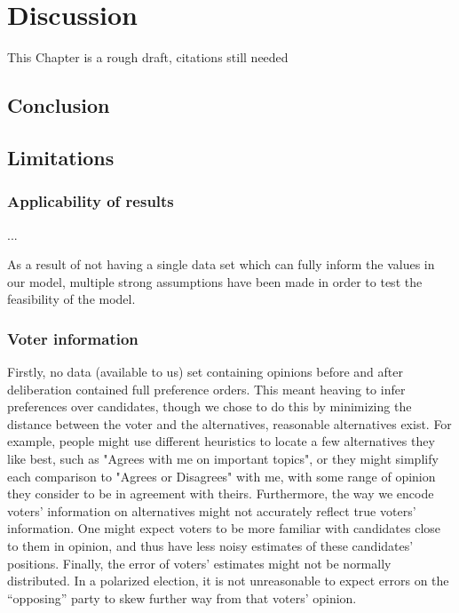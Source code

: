 \newpage
\chapter{Discussion}
\label{Discussion}


\textcolor{RedOrange}{This Chapter is a rough draft, citations still needed}
\section{Conclusion}



\section{Limitations}

\subsection{Applicability of results}
...


As a result of not having a single data set which can fully inform the values
in our model, multiple strong assumptions have been made in order to test the
feasibility of the model.

\subsection{Voter information}

Firstly, no data (available to us) set containing opinions before and after
deliberation contained full preference orders. This meant heaving to infer
preferences over candidates, though we chose to do this by minimizing the
distance between the voter and the alternatives, reasonable alternatives exist.
For example, people might use different heuristics to locate a few alternatives
they like best, such as "Agrees with me on important topics", or they might
simplify each comparison to "Agrees or Disagrees" with me, with some range of
opinion they consider to be in agreement with theirs. Furthermore, the way we
encode voters' information on alternatives might not accurately reflect true
voters' information. One might expect voters to be more familiar with
candidates close to them in opinion, and thus have less noisy estimates of
these candidates' positions. Finally,  the error of voters' estimates might not
be normally distributed. In a polarized election, it is not unreasonable to
expect errors on the ``opposing'' party to skew further way from that voters'
opinion.


